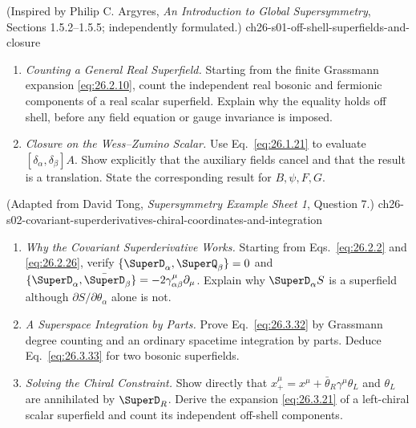 
\begin{enumerate}
    {(Inspired by Philip C. Argyres, \emph{An Introduction to Global Supersymmetry}, Sections 1.5.2--1.5.5; independently formulated.)}
    {ch26-s01-off-shell-superfields-and-closure}
  \begin{enumerate}
    \item \emph{Counting a General Real Superfield.}
    Starting from the finite Grassmann expansion
      \eqref{eq:26.2.10}, count the independent real bosonic and fermionic
      components of a real scalar superfield.  Explain why the equality holds
      off shell, before any field equation or gauge invariance is imposed.
    \item \emph{Closure on the Wess--Zumino Scalar.}
    Use Eq.~\eqref{eq:26.1.21} to evaluate
      \([\delta_\alpha,\delta_\beta]A\).  Show explicitly that the auxiliary
      fields cancel and that the result is a translation.  State the
      corresponding result for \(B,\psi,F,G\).
  \end{enumerate}

    {(Adapted from David Tong, \emph{Supersymmetry Example Sheet 1}, Question 7.)}
    {ch26-s02-covariant-superderivatives-chiral-coordinates-and-integration}
  \begin{enumerate}
    \item \emph{Why the Covariant Superderivative Works.}
    Starting from Eqs.~\eqref{eq:26.2.2} and \eqref{eq:26.2.26}, verify
      \(\{\SuperD_\alpha,\SuperQ_\beta\}=0\) and
      \(\{\SuperD_\alpha,\bar{\SuperD}_\beta\}
      =-2\gamma^\mu_{\alpha\beta}\partial_\mu\).  Explain why
      \(\SuperD_\alpha S\) is a superfield although
      \(\partial S/\partial\theta_\alpha\) alone is not.
    \item \emph{A Superspace Integration by Parts.}
    Prove Eq.~\eqref{eq:26.3.32} by Grassmann degree counting and an ordinary
      spacetime integration by parts.  Deduce Eq.~\eqref{eq:26.3.33} for two
      bosonic superfields.
    \item \emph{Solving the Chiral Constraint.}
    Show directly that
      \(x_+^\mu=x^\mu+\bar\theta_R\gamma^\mu\theta_L\) and \(\theta_L\)
      are annihilated by \(\SuperD_R\).  Derive the expansion
      \eqref{eq:26.3.21} of a left-chiral scalar superfield and count its
      independent off-shell components.
  \end{enumerate}


\end{enumerate}
